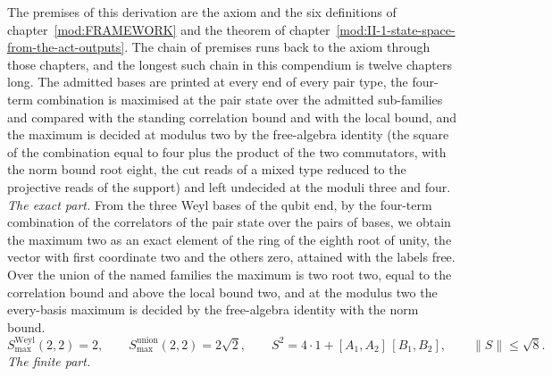 \begin{chproof}
The premises of this derivation are the axiom and the six definitions of chapter~\ref{mod:FRAMEWORK} and the theorem of chapter~\ref{mod:II-1-state-space-from-the-act-outputs}. The chain of premises runs back to the axiom through those chapters, and the longest such chain in this compendium is twelve chapters long.
The admitted bases are printed at every end of every pair type, the four-term combination is maximised at the pair state over the admitted sub-families and compared with the standing correlation bound and with the local bound, and the maximum is decided at modulus two by the free-algebra identity (the square of the combination equal to four plus the product of the two commutators, with the norm bound root eight, the cut reads of a mixed type reduced to the projective reads of the support) and left undecided at the moduli three and four.
\textit{The exact part.}
From the three Weyl bases of the qubit end, by the four-term combination of the correlators of the pair state over the pairs of bases, we obtain the maximum two as an exact element of the ring of the eighth root of unity, the vector with first coordinate two and the others zero, attained with the labels free. Over the union of the named families the maximum is two root two, equal to the correlation bound and above the local bound two, and at the modulus two the every-basis maximum is decided by the free-algebra identity with the norm bound.
\begin{equation}
S_{\max}^{\mathrm{Weyl}}(2,2) = 2, \qquad S_{\max}^{\mathrm{union}}(2,2) = 2\sqrt{2}, \qquad S^{2} = 4\cdot 1 + [A_{1},A_{2}]\,[B_{1},B_{2}], \qquad \|S\| \le \sqrt{8} .
\end{equation}
\textit{The finite part.}

\end{chproof}
